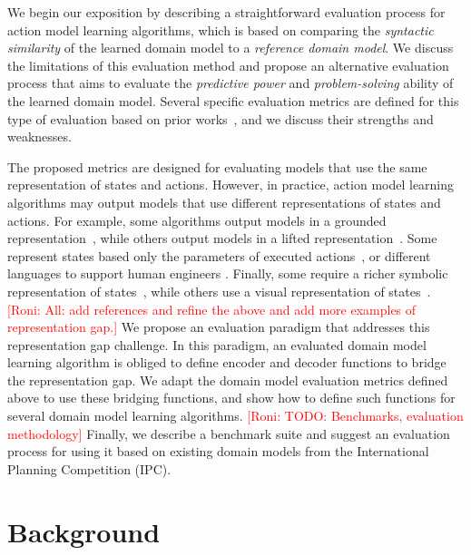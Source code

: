 \documentclass{article}
\theoremstyle{definition}
\theoremstyle{remark}
\newcommand{\roni}[1]{{\textcolor{red}{[Roni: #1]}}}
\begin{document}
We begin our exposition by describing a straightforward evaluation process for action model learning algorithms, which is based on comparing the \emph{syntactic similarity} of the learned domain model to a \emph{reference domain model}. We discuss the limitations of this evaluation method and propose an alternative evaluation process that aims to evaluate the \emph{predictive power} and \emph{problem-solving} ability of the learned domain model. 
Several specific evaluation metrics are defined for this type of evaluation based on prior works~\citep{aineto2019learning,juba2021safe,mordoch2024safe,Oswald2024DLLMDomainModeling}, and we discuss their strengths and weaknesses. 


The proposed metrics are designed for evaluating models that use the same representation of states and actions. 
However, in practice, action model learning algorithms may output models that use different representations of states and actions. 
For example, some algorithms output models in a grounded representation~\citep{stern2017efficient}, while others output models in a lifted representation~\citep{aineto2019learning,juba2021safe,xi2024neuro}. 
Some represent states based only the parameters of executed actions~\citep{cresswell2011generalised}, or different languages to support human engineers \citep{mccluskey2010action}. 
Finally, some require a richer symbolic representation of states~\citep{juba2021safe}, while others use a visual representation of states~\citep{xi2024neuro}.
\roni{All: add references and refine the above and add more examples of representation gap.}
We propose an evaluation paradigm that addresses this representation gap challenge. 
In this paradigm, an evaluated domain model learning algorithm is obliged to define encoder and decoder functions to bridge the representation gap. 
We adapt the domain model evaluation metrics defined above to use these bridging functions, 
and show how to define such functions for several domain model learning algorithms. 
\roni{TODO: Benchmarks, evaluation methodology}
Finally, we describe a benchmark suite and suggest an evaluation process for using it based on existing domain models from the International Planning Competition (IPC). 




\section{Background}
\end{document}
